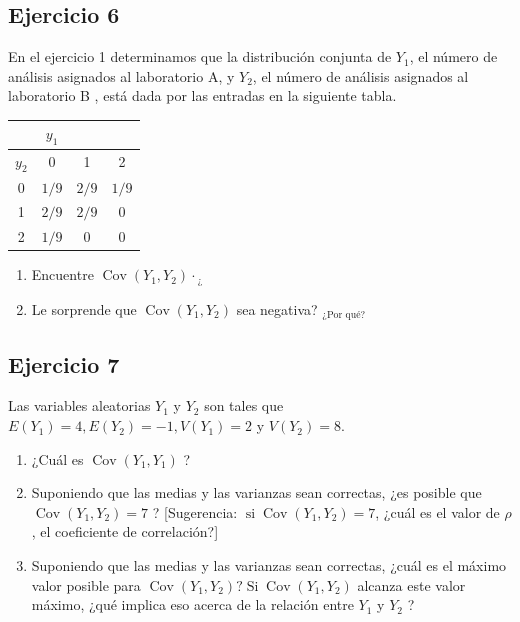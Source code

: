 \documentclass[
]{article}
\begin{document}
\subsection{Ejercicio 6}\label{ejercicio-6}

En el ejercicio 1 determinamos que la distribución conjunta de \(Y_{1}\), el número de análisis asignados al laboratorio A, y \(Y_{2}\), el número de análisis asignados al laboratorio B , está dada por las entradas en la siguiente tabla.

\begin{longtable}[]{@{}cccc@{}}
\toprule\noalign{}
& \(y_{1}\) & & \\
\midrule\noalign{}
\endhead
\bottomrule\noalign{}
\endlastfoot
\(y_{2}\) & 0 & 1 & 2 \\
0 & \(1 / 9\) & \(2 / 9\) & \(1 / 9\) \\
1 & \(2 / 9\) & \(2 / 9\) & 0 \\
2 & \(1 / 9\) & 0 & 0 \\
\end{longtable}

\begin{enumerate}
\def\labelenumi{\alph{enumi}.}
\item
  Encuentre \(\operatorname{Cov}\left(Y_{1}, Y_{2}\right) \cdot{ }_{¿}\)
\item
  Le sorprende que \(\operatorname{Cov}\left(Y_{1}, Y_{2}\right)\) sea negativa? \({ }_{\text {¿Por qué? }}\)
\end{enumerate}

\subsection{Ejercicio 7}\label{ejercicio-7}

Las variables aleatorias \(Y_{1}\) y \(Y_{2}\) son tales que \(E\left(Y_{1}\right)=4, E\left(Y_{2}\right)=-1, V\left(Y_{1}\right)=2\) y \(V\left(Y_{2}\right)=8\).

\begin{enumerate}
\def\labelenumi{\alph{enumi}.}
\item
  ¿Cuál es \(\operatorname{Cov}\left(Y_{1}, Y_{1}\right)\) ?
\item
  Suponiendo que las medias y las varianzas sean correctas, ¿es posible que \(\operatorname{Cov}\left(Y_{1}, Y_{2}\right)=7\) ? {[}Sugerencia: \(\operatorname{si} \operatorname{Cov}\left(Y_{1}, Y_{2}\right)=7\), ¿cuál es el valor de \(\rho\), el coeficiente de correlación?{]}
\item
  Suponiendo que las medias y las varianzas sean correctas, ¿cuál es el máximo valor posible para \(\operatorname{Cov}\left(Y_{1}, Y_{2}\right) ? \operatorname{Si} \operatorname{Cov}\left(Y_{1}, Y_{2}\right)\) alcanza este valor máximo, ¿qué implica eso acerca de la relación entre \(Y_{1}\) y \(Y_{2}\) ?
\end{enumerate}
\end{document}

